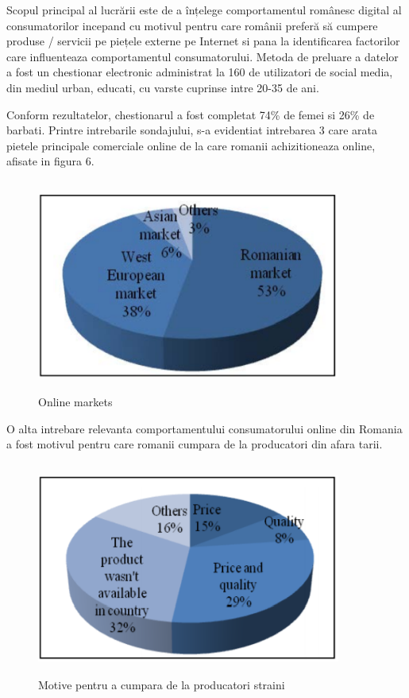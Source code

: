 \documentclass[a4paper, 12pt]{article}
\begin{document}
		\quad Scopul principal al lucrării este de a înțelege comportamentul românesc digital al consumatorilor incepand cu motivul pentru care românii preferă să cumpere produse / servicii pe piețele externe pe Internet si pana la identificarea factorilor care influenteaza comportamentul consumatorului. Metoda de preluare a datelor a fost un chestionar electronic administrat la 160 de utilizatori de social media, din mediul urban, educati, cu varste cuprinse intre 20-35 de ani.
		
		\quad Conform rezultatelor, chestionarul a fost completat 74\% de femei si 26\% de barbati. Printre intrebarile sondajului, s-a evidentiat intrebarea 3 care arata pietele principale comerciale online de la care romanii achizitioneaza online, afisate in figura 6. 
		\begin{figure}[!htb]
			\centering
			\includegraphics[width=10cm, height=7cm]{"figures/sixth.png"}
			\caption{Online markets}\label{fig:sixth}
		\end{figure}
	\newpage
	\qquad O alta intrebare relevanta comportamentului consumatorului online din Romania a fost motivul pentru care romanii cumpara de la producatori din afara tarii.
	\begin{figure}[!htb]
		\centering
		\includegraphics[width=10cm, height=7cm]{"figures/seventh.png"}
		\caption{Motive pentru a cumpara de la producatori straini}\label{fig:seventh}
	\end{figure}
\end{document}
